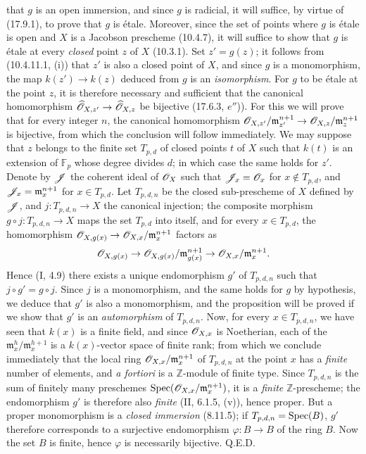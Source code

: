 that $g$ is an open immersion, and since $g$ is radicial, it will suffice, by virtue of (17.9.1), to prove that $g$ is étale. Moreover, since the set of points where $g$ is étale is open and $X$ is a Jacobson prescheme (10.4.7), it will suffice to show that $g$ is étale at every \emph{closed} point $z$ of $X$ (10.3.1). Set $z'=g(z)$; it follows from (10.4.11.1, (i)) that $z'$ is also a closed point of $X$, and since $g$ is a monomorphism, the map $k(z')\to k(z)$ deduced from $g$ is an \emph{isomorphism}. For $g$ to be étale at the point $z$, it is therefore necessary and sufficient that the canonical homomorphism $\widehat{\mathscr{O}}_{X,z'}\to\widehat{\mathscr{O}}_{X,z}$ be bijective (17.6.3, $e''$)). For this we will prove that for every integer $n$, the canonical homomorphism $\mathscr{O}_{X,z'}/\mathfrak m_{z'}^{n+1}\to\mathscr{O}_{X,z}/\mathfrak m_z^{n+1}$ is bijective, from which the conclusion will follow immediately. We may suppose that $z$ belongs to the finite set $T_{p,d}$ of closed points $t$ of $X$ such that $k(t)$ is an extension of $\mathbb{F}_p$ whose degree divides $d$; in which case the same holds for $z'$. Denote by $\mathscr{J}$ the coherent ideal of $\mathscr{O}_X$ such that $\mathscr{J}_x=\mathscr{O}_x$ for $x\notin T_{p,d}$, and $\mathscr{J}_x=\mathfrak m_x^{n+1}$ for $x\in T_{p,d}$. Let $T_{p,d,n}$ be the closed sub-prescheme of $X$ defined by $\mathscr{J}$, and $j:T_{p,d,n}\to X$ the canonical injection; the composite morphism $g\circ j:T_{p,d,n}\to X$ maps the set $T_{p,d}$ into itself, and for every $x\in T_{p,d}$, the homomorphism $\mathscr{O}_{X,g(x)}\to\mathscr{O}_{X,x}/\mathfrak m_x^{n+1}$ factors as
\[
\mathscr{O}_{X,g(x)}\to\mathscr{O}_{X,g(x)}/\mathfrak m_{g(x)}^{n+1}\to\mathscr{O}_{X,x}/\mathfrak m_x^{n+1}.
\]
Hence (I, 4.9) there exists a unique endomorphism $g'$ of $T_{p,d,n}$ such that $j\circ g'=g\circ j$. Since $j$ is a monomorphism, and the same holds for $g$ by hypothesis, we deduce that $g'$ is also a monomorphism, and the proposition will be proved if we show that $g'$ is an \emph{automorphism} of $T_{p,d,n}$. Now, for every $x\in T_{p,d,n}$, we have seen that $k(x)$ is a finite field, and since $\mathscr{O}_{X,x}$ is Noetherian, each of the $\mathfrak m_x^h/\mathfrak m_x^{h+1}$ is a $k(x)$-vector space of finite rank; from which we conclude immediately that the local ring $\mathscr{O}_{X,x}/\mathfrak m_x^{n+1}$ of $T_{p,d,n}$ at the point $x$ has a \emph{finite} number of elements, and \emph{a fortiori} is a $\mathbb{Z}$-module of finite type. Since $T_{p,d,n}$ is the sum of finitely many preschemes $\operatorname{Spec}(\mathscr{O}_{X,x}/\mathfrak m_x^{n+1})$, it is a \emph{finite} $\mathbb{Z}$-prescheme; the endomorphism $g'$ is therefore also \emph{finite} (II, 6.1.5, (v)), hence proper. But a proper monomorphism is a \emph{closed immersion} (8.11.5); if $T_{p,d,n}=\operatorname{Spec}(B)$, $g'$ therefore corresponds to a surjective endomorphism $\varphi:B\to B$ of the ring $B$. Now the set $B$ is finite, hence $\varphi$ is necessarily bijective. Q.E.D.

